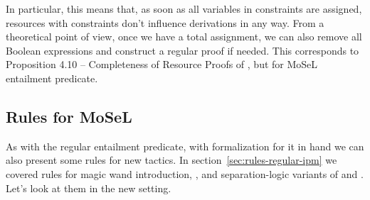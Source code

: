 In particular, this means that, as soon as all variables in constraints are assigned, resources with \false constraints don't influence derivations in any way.
From a theoretical point of view, once we have a total assignment, we can also remove all Boolean expressions and construct a regular proof if needed.
This corresponds to Proposition 4.10 -- Completeness of Resource Proofs of \citet[page~25]{harlandResourceDistributionBooleanConstraints2003}, but for MoSeL entailment predicate.

\subsection{Rules for MoSeL}

As with the regular entailment predicate, with formalization for it in hand we can also present some rules for new tactics.
In section~\ref{sec:rules-regular-ipm} we covered rules for magic wand introduction, , and separation-logic variants of  and .
Let's look at them in the new setting.


